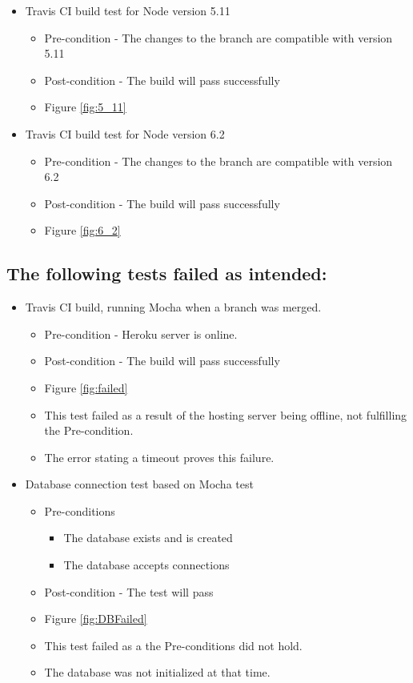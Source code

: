\documentclass{article}
\begin{document}
\begin{itemize}
\item Travis CI build test for Node version 5.11
	\begin{itemize}
	\item Pre-condition - The changes to the branch are compatible with version 5.11
	\item Post-condition - The build will pass successfully 
	\item Figure \ref{fig:5_11}
	\end{itemize}	
	
\item Travis CI build test for Node version 6.2
	\begin{itemize}
	\item Pre-condition - The changes to the branch are compatible with version 6.2
	\item Post-condition - The build will pass successfully 
	\item Figure \ref{fig:6_2}
	\end{itemize}	
\end{itemize}

\cleardoublepage
\subsection{The following tests failed as intended:}
\begin{itemize}
	\item Travis CI build, running Mocha when a branch was merged.
	\begin{itemize}
	\item Pre-condition - Heroku server is online.
	\item Post-condition - The build will pass successfully 
	\item Figure \ref{fig:failed}
	\item This test failed as a result of the hosting server being offline, not fulfilling the Pre-condition. 
	\item The error stating a timeout proves this failure.
	\end{itemize}
	
	\item Database connection test based on Mocha test
	\begin{itemize}
	\item Pre-conditions
	\begin{itemize}
		\item The database exists and is created
		\item The database accepts connections
	\end{itemize}
	\item Post-condition - The test will pass
	\item Figure \ref{fig:DBFailed}
	\item This test failed as a the Pre-conditions did not hold. 
	\item The database was not initialized at that time.
	\end{itemize}		
\end{itemize}
\end{document}
